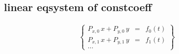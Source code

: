 \documentclass["AM3C-Slides_annotations.tex"]{subfiles}
\begin{document}
\begin{minipage}{60em}
\begin{sectionBox}
    
    \begin{minipage}{30em}
    \subsection*{linear eqsystem of constcoeff} %
      \begin{tcolorbox}
        \begin{align*}
          \begin{Bmatrix}
            P_{x,0}\,x + P_{y,0}\,y &=& f_0(t)
            \\
            P_{x,1}\,x + P_{y,1}\,y &=& f_1(t)
            \\
            \dots
          \end{Bmatrix}
        \end{align*}
      \end{tcolorbox}
    \end{minipage}

  \end{sectionBox}\end{minipage}
\end{document}
